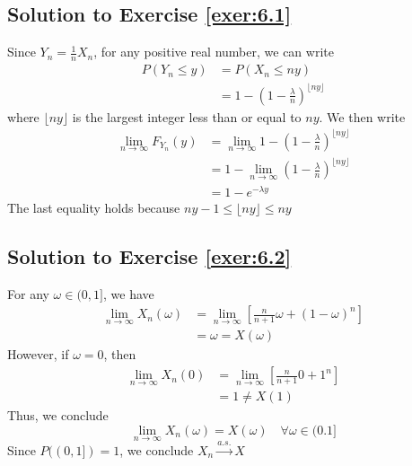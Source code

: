 \documentclass[12pt]{book}
\numberwithin{equation}{chapter}
\theoremstyle{plain}
\numberwithin{theorem}{section}
\theoremstyle{definition}
\numberwithin{exercise}{chapter}
\newcommand{\<}{\langle}
\renewcommand{\>}{\rangle}
\renewcommand{\(}{\left(}
\renewcommand{\)}{\right)}
\renewcommand{\[}{\left[}
\renewcommand{\]}{\right]}
\newcommand\om{\omega}
\begin{document}
\subsection*{Solution to Exercise \ref{exer:6.1}}
Since $Y_n = \frac{1}{n}X_n$, for any positive real number, we can write 
\begin{align}
 P(Y_n \leq y) &= P(X_n \leq ny)\\
                      &= 1 - (1 - \frac{\lambda}{n})^{\lfloor ny \rfloor}
\end{align}
where $\lfloor ny \rfloor$ is the largest integer less than or equal to $ny$. We then write 
\begin{align}
 \lim_{n\rightarrow \infty} F_{Y_n}(y) &= \lim_{n \rightarrow \infty}1 - (1 - \frac{\lambda}{n})^{\lfloor ny \rfloor}\\
    &= 1-  \lim_{n\rightarrow \infty} (1 - \frac{\lambda}{n})^{\lfloor ny \rfloor}\\
    &= 1 - e^{- \lambda y}
\end{align}
The last equality holds because $ny - 1 \leq  \lfloor ny \rfloor \leq ny$

\subsection*{Solution to Exercise \ref{exer:6.2}}
For any $\om \in (0,1]$, we have 
\begin{align}
\lim_{n\rightarrow \infty} X_n( \omega) &= \lim_{n \rightarrow \infty}\left[ \frac{n}{n+1}\omega + (1-\omega)^n\right]\\
     &= \omega= X(\omega)
\end{align} 
However, if $\omega=0$, then 
\begin{align}
\lim_{n\rightarrow \infty} X_n(0) &= \lim_{n \rightarrow \infty}\left[ \frac{n}{n+1}0 + 1^n\right]\\
     &= 1 \neq X(1)
\end{align} 
Thus, we conclude 
$$ \lim_{n\rightarrow \infty} X_n(\omega) = X(\omega) \quad \forall \omega\in (0.1]$$
Since $P((0,1]) = 1$, we conclude $X_n \stackrel{a.s.}{\rightarrow}X$
\end{document}
